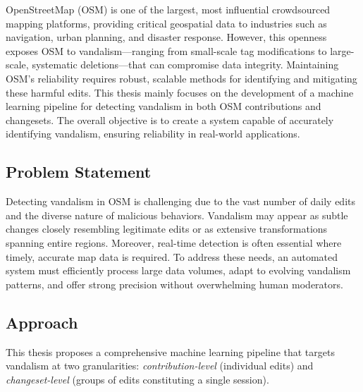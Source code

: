 \documentclass[
    13pt, %
    a4paper, %
    listof=totoc, %
    bibliography=totoc, %
    index=totoc, %
    headsepline
]{scrreprt}
\begin{document}
\vspace{1em}
\noindent
OpenStreetMap (OSM) is one of the largest, most influential crowdsourced mapping platforms, providing critical geospatial data to industries such as navigation, urban planning, and disaster response. However, this openness exposes OSM to vandalism—ranging from small-scale tag modifications to large-scale, systematic deletions—that can compromise data integrity. Maintaining OSM’s reliability requires robust, scalable methods for identifying and mitigating these harmful edits. This thesis mainly focuses on the development of a machine learning pipeline for detecting vandalism in both OSM contributions and changesets. The overall objective is to create a system capable of accurately identifying vandalism, ensuring reliability in real-world applications.


\subsection*{Problem Statement}
\noindent
Detecting vandalism in OSM is challenging due to the vast number of daily edits and the diverse nature of malicious behaviors. Vandalism may appear as subtle changes closely resembling legitimate edits or as extensive transformations spanning entire regions. Moreover, real-time detection is often essential where timely, accurate map data is required. To address these needs, an automated system must efficiently process large data volumes, adapt to evolving vandalism patterns, and offer strong precision without overwhelming human moderators.

\subsection*{Approach}
\noindent
This thesis proposes a comprehensive machine learning pipeline that targets vandalism at two granularities: \emph{contribution-level} (individual edits) and \emph{changeset-level} (groups of edits constituting a single session).
\end{document}
